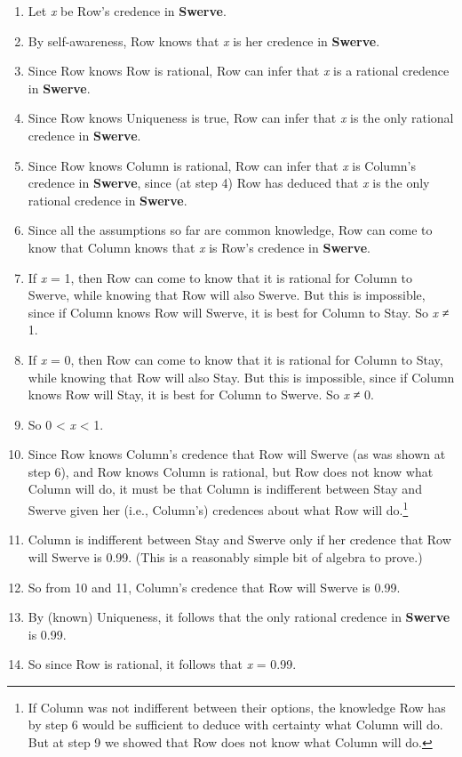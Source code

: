 \documentclass[
  12pt,
  letterpaper,
  DIV=11,
  numbers=noendperiod]{scrreprt}
\providecommand{\tightlist}{%
  \setlength{\itemsep}{0pt}\setlength{\parskip}{0pt}}\usepackage{longtable,booktabs,array}
\begin{document}
\begin{enumerate}
\def\labelenumi{\arabic{enumi}.}
\tightlist
\item
  Let \emph{x} be Row's credence in \textbf{Swerve}.
\item
  By self-awareness, Row knows that \emph{x} is her credence in
  \textbf{Swerve}.
\item
  Since Row knows Row is rational, Row can infer that \emph{x} is a
  rational credence in \textbf{Swerve}.
\item
  Since Row knows Uniqueness is true, Row can infer that \emph{x} is the
  only rational credence in \textbf{Swerve}.
\item
  Since Row knows Column is rational, Row can infer that \emph{x} is
  Column's credence in \textbf{Swerve}, since (at step 4) Row has
  deduced that \emph{x} is the only rational credence in
  \textbf{Swerve}.
\item
  Since all the assumptions so far are common knowledge, Row can come to
  know that Column knows that \emph{x} is Row's credence in
  \textbf{Swerve}.
\item
  If \emph{x} = 1, then Row can come to know that it is rational for
  Column to Swerve, while knowing that Row will also Swerve. But this is
  impossible, since if Column knows Row will Swerve, it is best for
  Column to Stay. So \emph{x} ≠ 1.
\item
  If \emph{x} = 0, then Row can come to know that it is rational for
  Column to Stay, while knowing that Row will also Stay. But this is
  impossible, since if Column knows Row will Stay, it is best for Column
  to Swerve. So \emph{x} ≠ 0.
\item
  So 0 \textless{} \emph{x} \textless{} 1.
\item
  Since Row knows Column's credence that Row will Swerve (as was shown
  at step 6), and Row knows Column is rational, but Row does not know
  what Column will do, it must be that Column is indifferent between
  Stay and Swerve given her (i.e., Column's) credences about what Row
  will do.\footnote{If Column was not indifferent between their options,
    the knowledge Row has by step 6 would be sufficient to deduce with
    certainty what Column will do. But at step 9 we showed that Row does
    not know what Column will do.}
\item
  Column is indifferent between Stay and Swerve only if her credence
  that Row will Swerve is 0.99. (This is a reasonably simple bit of
  algebra to prove.)
\item
  So from 10 and 11, Column's credence that Row will Swerve is 0.99.
\item
  By (known) Uniqueness, it follows that the only rational credence in
  \textbf{Swerve} is 0.99.
\item
  So since Row is rational, it follows that \emph{x} = 0.99.
\end{enumerate}
\end{document}
